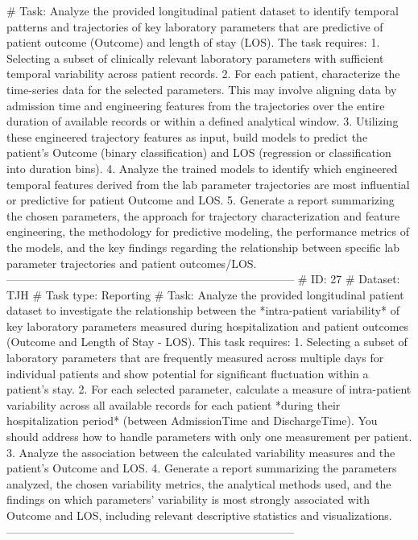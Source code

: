 \begin{tcolorbox}[colback=cadmiumgreen!5!white,colframe=forestgreen!75!white,breakable,title=\textit{Generated analytical tasks in task 4.}]
\begin{VerbatimWrap}
# Task: Analyze the provided longitudinal patient dataset to identify temporal patterns and trajectories of key laboratory parameters that are predictive of patient outcome (Outcome) and length of stay (LOS). The task requires: 1. Selecting a subset of clinically relevant laboratory parameters with sufficient temporal variability across patient records. 2. For each patient, characterize the time-series data for the selected parameters. This may involve aligning data by admission time and engineering features from the trajectories over the entire duration of available records or within a defined analytical window. 3. Utilizing these engineered trajectory features as input, build models to predict the patient's Outcome (binary classification) and LOS (regression or classification into duration bins). 4. Analyze the trained models to identify which engineered temporal features derived from the lab parameter trajectories are most influential or predictive for patient Outcome and LOS. 5. Generate a report summarizing the chosen parameters, the approach for trajectory characterization and feature engineering, the methodology for predictive modeling, the performance metrics of the models, and the key findings regarding the relationship between specific lab parameter trajectories and patient outcomes/LOS.
-----------------------------------------------------------------------------
# ID: 27  
# Dataset: TJH 
# Task type: Reporting
# Task: Analyze the provided longitudinal patient dataset to investigate the relationship between the *intra-patient variability* of key laboratory parameters measured during hospitalization and patient outcomes (Outcome and Length of Stay - LOS). This task requires: 1. Selecting a subset of laboratory parameters that are frequently measured across multiple days for individual patients and show potential for significant fluctuation within a patient's stay. 2. For each selected parameter, calculate a measure of intra-patient variability across all available records for each patient *during their hospitalization period* (between AdmissionTime and DischargeTime). You should address how to handle parameters with only one measurement per patient. 3. Analyze the association between the calculated variability measures and the patient's Outcome and LOS. 4. Generate a report summarizing the parameters analyzed, the chosen variability metrics, the analytical methods used, and the findings on which parameters' variability is most strongly associated with Outcome and LOS, including relevant descriptive statistics and visualizations.
-----------------------------------------------------------------------------

\end{VerbatimWrap}
\end{tcolorbox}
